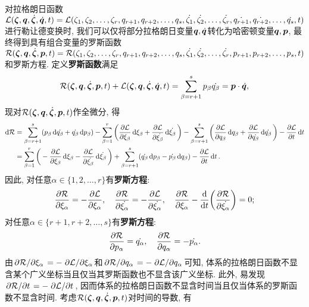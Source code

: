 对拉格朗日函数$ \mathcal{L}(\vb*{\zeta},\vb*{q},\dot{\vb*{\zeta}},\dot{\vb*{q}},t)=\mathcal{L}(\zeta_1,\zeta_2,\ldots,\zeta_r,q_{r+1},q_{r+2},\ldots,q_s,\dot{\zeta_1},\dot{\zeta_2},\ldots,\dot{\zeta_r},\dot{q_{r+1}},\dot{q_{r+2}},\ldots,\dot{q_s},t) $进行勒让德变换时, 我们可以仅将部分拉格朗日变量$ \vb*{q},\dot{\vb*{q}} $转化为哈密顿变量$ \vb*{q},\vb*{p} $, 最终得到具有组合变量的罗斯函数$ \mathcal{R}(\vb*{\zeta},\vb*{q},\dot{\vb*{\zeta}},\vb*{p},t)=\mathcal{R}(\zeta_1,\zeta_2,\ldots,\zeta_r,q_{r+1},q_{r+2},\ldots,q_s,\dot{\zeta_1},\dot{\zeta_2},\ldots,\dot{\zeta_r},p_{r+1},p_{r+2},\ldots,p_s,t) $和罗斯方程. 定义\textbf{罗斯函数}满足
\begin{equation}
    \mathcal{R}(\vb*{\zeta},\vb*{q},\dot{\vb*{\zeta}},\vb*{p},t) + \mathcal{L}(\vb*{\zeta},\vb*{q},\dot{\vb*{\zeta}},\dot{\vb*{q}},t) = \sum_{\beta=r+1}^s p_{\beta}\dot{q_{\beta}} = \vb*{p} \cdot \dot{\vb*{q}},
\end{equation}
现对$ \mathcal{R}(\vb*{\zeta},\vb*{q},\dot{\vb*{\zeta}},\vb*{p},t) $作全微分, 得
\begin{align*}
    \dd{\mathcal{R}} &= \sum_{\beta=r+1}^s (p_{\beta} \dd{\dot{q_{\beta}}} + \dot{q_{\beta}} \dd{p_{\beta}}) - \sum_{\beta=1}^r \bigg(\pdv{\mathcal{L}}{\xi_{\beta}}\dd{\xi_{\beta}} + \pdv{\mathcal{L}}{\dot{\xi_{\beta}}}\dd{\dot{\xi_{\beta}}}\bigg) - \sum_{\beta=r+1}^s \bigg(\pdv{\mathcal{L}}{q_{\beta}}\dd{q_{\beta}} + \pdv{\mathcal{L}}{\dot{q_{\beta}}}\dd{\dot{q_{\beta}}}\bigg) - \pdv{\mathcal{L}}{t}\dd{t} \\
    &= \sum_{\beta=1}^r \bigg(- \pdv{\mathcal{L}}{\xi_{\beta}}\dd{\xi_{\beta}} - \pdv{\mathcal{L}}{\dot{\xi_{\beta}}}\dd{\dot{\xi_{\beta}}}\bigg) + \sum_{\beta=r+1}^s (\dot{q_{\beta}}\dd{p_{\beta}} - \dot{p_{\beta}}\dd{q_{\beta}}) - \pdv{\mathcal{L}}{t}\dd{t}.
\end{align*}
因此, 对任意$ \alpha \in \{1,2,\ldots,r\} $有\textbf{罗斯方程}:
\begin{equation}
    \pdv{\mathcal{R}}{\xi_{\alpha}} = -\pdv{\mathcal{L}}{\xi_{\alpha}}, \quad \pdv{\mathcal{R}}{\dot{\xi_{\alpha}}} = -\pdv{\mathcal{L}}{\dot{\xi_{\alpha}}}, \quad\pdv{\mathcal{R}}{\xi_{\alpha}} - \dv{t}(\pdv{\mathcal{R}}{\dot{\xi_{\alpha}}}) = 0;
\end{equation}
对任意$ \alpha \in \{r+1,r+2,\ldots,s\} $有\textbf{罗斯方程}:
\begin{equation}
    \pdv{\mathcal{R}}{p_{\alpha}} = \dot{q_{\alpha}}, \quad \pdv{\mathcal{R}}{q_{\alpha}} = -\dot{p_{\alpha}}.
\end{equation}
由$ \pdv*{\mathcal{R}}{\xi_{\alpha}} = -\pdv*{\mathcal{L}}{\xi_{\alpha}} $和$ \pdv*{\mathcal{R}}{q_{\alpha}} = -\pdv*{\mathcal{L}}{q_{\alpha}} $可知, 体系的拉格朗日函数不显含某个广义坐标当且仅当其罗斯函数也不显含该广义坐标. 此外, 易发现$ \pdv*{\mathcal{R}}{t} = -\pdv*{\mathcal{L}}{t} $, 因而体系的拉格朗日函数不显含时间当且仅当体系的罗斯函数不显含时间. 考虑$ \mathcal{R}(\vb*{\zeta},\vb*{q},\dot{\vb*{\zeta}},\vb*{p},t) $对时间的导数, 有
